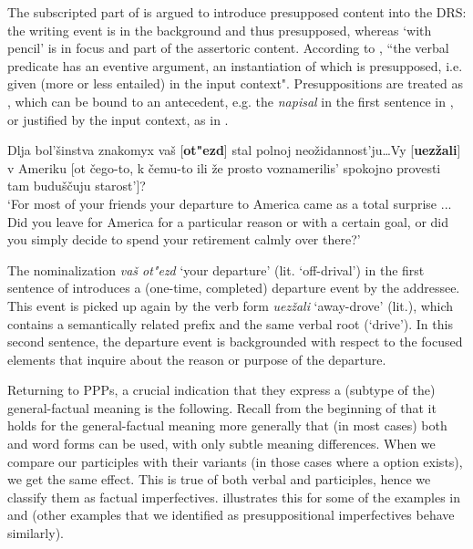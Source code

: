 \documentclass[output=paper,modfonts,newtxmath,hidelinks
\ChapterDOI{10.5281/zenodo.2545513}
]{langscibook}
\begin{document}
\noindent The subscripted part of  is argued to introduce presupposed content into the DRS: the writing event is in the background and thus presupposed, whereas `with pencil' is in focus and part of the assertoric content. According to \citet[][192]{gronndiss}, ``the verbal predicate has an eventive argument, an instantiation of which is presupposed, i.e. given (more or less entailed) in the input context". Presuppositions are treated as , which can be bound to an antecedent, e.g. the  \textit{napisal} in the first sentence in , or justified by the input context, as in .

\ea Dlja bol'šinstva znakomyx vaš [\textbf{ot"ezd}] stal polnoj  neožidannost'ju\dots Vy [\textbf{uezžali}] v Ameriku [ot čego-to, k čemu-to ili že
	prosto voznamerilis' spokojno provesti tam buduščuju starost']?\\
`For most of your friends your departure to America came as a total surprise ... Did you leave for America for a particular reason or with a certain goal, or did you simply decide to spend your retirement calmly over there?'\label{departure}\hfill \citep[][207f.]{gronndiss}
\z

\noindent The nominalization \textit{vaš ot"ezd} `your departure' (lit. `off-drival') in the first sentence of  introduces a (one-time, completed) departure event by the addressee. This event is picked up again by the  verb form \textit{uezžali} `away-drove' (lit.), which contains a semantically related prefix and the same verbal root (`drive'). In this second sentence, the departure event is backgrounded with respect to the focused elements that inquire about the reason or purpose of the departure. 

Returning to  PPPs, a crucial indication that they express a (subtype of the) general-factual  meaning is the following. Recall from the beginning of  that it holds for the general-factual meaning more generally that (in most cases) both  and  word forms can be used, with only subtle meaning differences. When we compare our  participles with their  variants (in those cases where a  option exists), we get the same effect. This is true of both verbal and  participles, hence we classify them as factual imperfectives.  illustrates this for some of the examples in  and  (other examples that we identified as presuppositional imperfectives behave similarly). 
\end{document}
